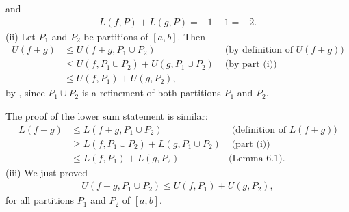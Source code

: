 \documentclass[letterpaper,10pt,english]{jupyterBook}
\begin{document}
\sphinxAtStartPar
and
\begin{equation*}
\begin{split}
L(f,P)+L(g,P) = -1 -1 =-2.
\end{split}
\end{equation*}
\sphinxAtStartPar
(ii) Let \(P_1\) and \(P_2\) be partitions of \([a,b]\). Then
\begin{align*}
U(f+g) &\leq U(f+g,P_1\cup P_2) & \text{ (by definition of $U(f+g)$)}\\
&\leq U(f,P_1\cup P_2) + U(g,P_1\cup P_2) & \text{ (by part (i))}\\
&\leq U(f,P_1) + U(g,P_2),
\end{align*}
\sphinxAtStartPar
by , since \(P_1\cup P_2\) is a refinement of both partitions \(P_1\) and \(P_2\).

\sphinxAtStartPar
The proof of the lower sum statement is similar:
\begin{align*}
L(f+g) &\leq L(f+g,P_1\cup P_2) & \text{ (definition of $L(f+g)$)}\\
&\geq L(f,P_1\cup P_2) + L(g,P_1\cup P_2) & \text{ (part (i))}\\
&\leq L(f,P_1) + L(g,P_2) & \text{(Lemma 6.1).}
\end{align*}
\sphinxAtStartPar
(iii) We just proved
\begin{equation*}
\begin{split}
U(f+g,P_1\cup P_2) \leq U(f,P_1) + U(g,P_2),
\end{split}
\end{equation*}
\sphinxAtStartPar
for all partitions \(P_1\) and \(P_2\) of \([a,b]\).
\end{document}
